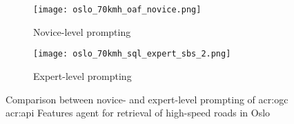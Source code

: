 \begin{figure}[htbp]
    \centering
    \begin{subfigure}[b]{0.7\textwidth}
        \centering
        \texttt{[image: oslo\_70kmh\_oaf\_novice.png]}
        \caption{Novice-level prompting}
        \label{fig:novice-level-prompting-oslo-70kmh}
    \end{subfigure}
    \hfill
    \begin{subfigure}[b]{0.7\textwidth}
        \centering
        \texttt{[image: oslo\_70kmh\_sql\_expert\_sbs\_2.png]}
        \caption{Expert-level prompting}
        \label{fig:expert-level-prompting-oslo-70kmh}
    \end{subfigure}
    \caption{Comparison between novice- and expert-level prompting of \acrshort{acr:ogc} \acrshort{acr:api} Features agent for retrieval of high-speed roads in Oslo}
    \label{fig:novice-vs-expert-oslo-70kmh}
\end{figure}

\glsresetall